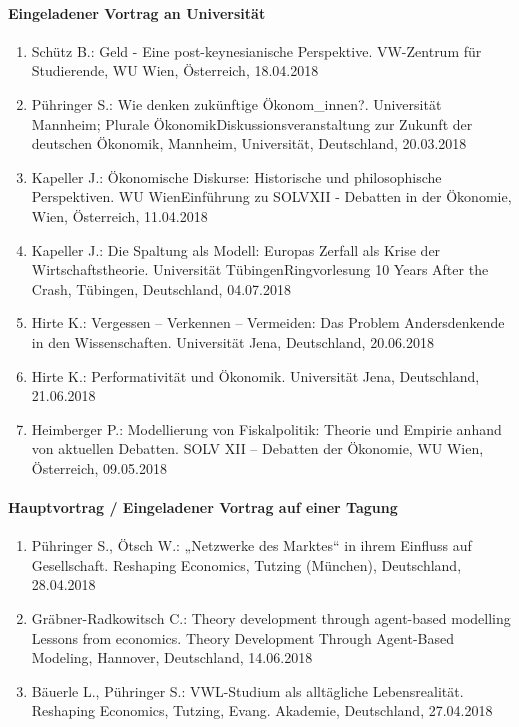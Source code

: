 \paragraph{Eingeladener Vortrag an Universität}
\begin{enumerate}
	\item Schütz B.: Geld - Eine post-keynesianische Perspektive. VW-Zentrum für Studierende, WU Wien, Österreich, 18.04.2018
	\item Pühringer S.: Wie denken zukünftige Ökonom_innen?. Universität Mannheim; Plurale ÖkonomikDiskussionsveranstaltung zur Zukunft der deutschen Ökonomik, Mannheim, Universität, Deutschland, 20.03.2018
	\item Kapeller J.: Ökonomische Diskurse: Historische und philosophische Perspektiven. WU WienEinführung zu SOLVXII - Debatten in der Ökonomie, Wien, Österreich, 11.04.2018
	\item Kapeller J.: Die Spaltung als Modell: Europas Zerfall als Krise der Wirtschaftstheorie. Universität TübingenRingvorlesung 10 Years After the Crash, Tübingen, Deutschland, 04.07.2018
	\item Hirte K.: Vergessen – Verkennen – Vermeiden: Das Problem Andersdenkende in den Wissenschaften. Universität Jena, Deutschland, 20.06.2018
	\item Hirte K.: Performativität und Ökonomik. Universität Jena, Deutschland, 21.06.2018
	\item Heimberger P.: Modellierung von Fiskalpolitik: Theorie und Empirie anhand von aktuellen Debatten. SOLV XII – Debatten der Ökonomie, WU Wien, Österreich, 09.05.2018
\end{enumerate}
\paragraph{Hauptvortrag / Eingeladener Vortrag auf einer Tagung}
\begin{enumerate}
	\item Pühringer S., Ötsch W.: „Netzwerke des Marktes“ in ihrem Einfluss auf Gesellschaft. Reshaping Economics, Tutzing (München), Deutschland, 28.04.2018
	\item Gräbner-Radkowitsch C.: Theory development through agent-based modelling Lessons from economics. Theory Development Through Agent-Based Modeling, Hannover, Deutschland, 14.06.2018
	\item Bäuerle L., Pühringer S.: VWL-Studium als alltägliche Lebensrealität. Reshaping Economics, Tutzing, Evang. Akademie, Deutschland, 27.04.2018
\end{enumerate}
